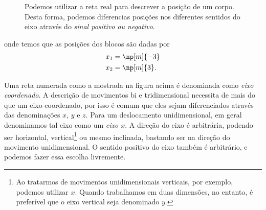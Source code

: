 \begin{figure}
\centering
{}
\caption{Podemos utilizar a reta real para descrever a posição de um corpo. Desta forma, podemos diferencias posições nos diferentes sentidos do eixo através do \emph{sinal positivo ou negativo}.\label{Fig:dois_blocos}}
\end{figure}

\noindent{}onde temos que as posições dos blocos são dadas por
\begin{align}
    x_1 &= \np[m]{-3} \\
    x_2 &= \np[m]{3}.
\end{align}

Uma reta numerada como a mostrada na figura acima é denominada como \emph{eixo coordenado}. A descrição de movimentos bi e tridimensional necessita de mais do que um eixo coordenado, por isso é comum que eles sejam diferenciados através das denominações $x$, $y$ e $z$. Para um deslocamento unidimensional, em geral denominamos tal eixo como um \emph{eixo $x$}. A direção do eixo é arbitrária, podendo ser horizontal, vertical\footnote{Ao tratarmos de movimentos unidimensionais verticais, por exemplo, podemos utilizar $x$. Quando trabalhamos em duas dimensões, no entanto, é preferível que o eixo vertical seja denominado $y$.} ou mesmo inclinada, bastando ser na direção do movimento unidimensional. O sentido positivo do eixo também é arbitrário, e podemos fazer essa escolha livremente.

